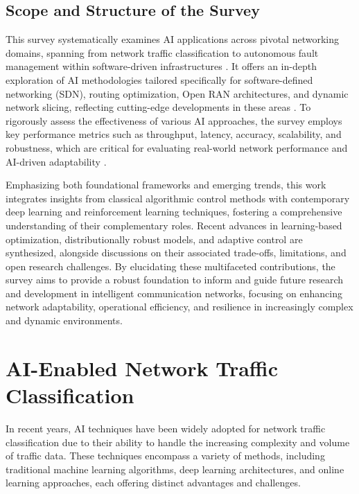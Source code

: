 \documentclass[sigconf]{acmart}
\begin{document}
\subsection{Scope and Structure of the Survey}

This survey systematically examines AI applications across pivotal networking domains, spanning from network traffic classification to autonomous fault management within software-driven infrastructures \cite{ref31,ref32}. It offers an in-depth exploration of AI methodologies tailored specifically for software-defined networking (SDN), routing optimization, Open RAN architectures, and dynamic network slicing, reflecting cutting-edge developments in these areas \cite{ref33,ref34,ref35}. To rigorously assess the effectiveness of various AI approaches, the survey employs key performance metrics such as throughput, latency, accuracy, scalability, and robustness, which are critical for evaluating real-world network performance and AI-driven adaptability \cite{ref51,ref52}.

Emphasizing both foundational frameworks and emerging trends, this work integrates insights from classical algorithmic control methods with contemporary deep learning and reinforcement learning techniques, fostering a comprehensive understanding of their complementary roles. Recent advances in learning-based optimization, distributionally robust models, and adaptive control are synthesized, alongside discussions on their associated trade-offs, limitations, and open research challenges. By elucidating these multifaceted contributions, the survey aims to provide a robust foundation to inform and guide future research and development in intelligent communication networks, focusing on enhancing network adaptability, operational efficiency, and resilience in increasingly complex and dynamic environments.

\section{AI-Enabled Network Traffic Classification}

In recent years, AI techniques have been widely adopted for network traffic classification due to their ability to handle the increasing complexity and volume of traffic data. These techniques encompass a variety of methods, including traditional machine learning algorithms, deep learning architectures, and online learning approaches, each offering distinct advantages and challenges.
\end{document}
